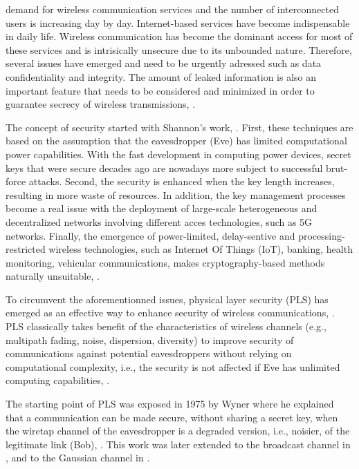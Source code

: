 \documentclass[journal,comsoc]{IEEEtran}
\begin{document}
 demand for wireless communication services and the number of interconnected users is increasing day by day. Internet-based services have become indispensable in daily life. Wireless communication has become the dominant access for most of these services and is intrisically unsecure due to its unbounded nature. Therefore, several issues have emerged and need to be urgently adressed such as data confidentiality and integrity. The amount of leaked information is also an important feature that needs to be considered and minimized in order to guarantee secrecy of wireless transmissions, \cite{8509094,8543573,BlochMatthieu1981-2011Ps:f}.

The concept of security started with Shannon's work, \cite{6769090}. First, these techniques are based on the assumption that the eavesdropper (Eve) has limited computational power capabilities. With the fast development in computing power devices, secret keys that were secure decades ago are nowadays more subject to successful brut-force attacks. Second, the security is enhanced when the key length increases, resulting in more waste of resources. In addition, the key management processes become a real issue with the deployment of large-scale heterogeneous and decentralized networks involving different acces technologies, such as 5G networks. Finally, the emergence of power-limited, delay-sentive and processing-restricted wireless technologies, such as Internet Of Things (IoT), banking, health monitoring, vehicular communications, makes cryptography-based methods naturally unsuitable, \cite{8509094}.

To circumvent the aforementionned issues, physical layer security (PLS) has emerged as an effective way to enhance security of wireless communications, \cite{alves2012performance,yang2012physical,tran2015secrecy,8353879}. PLS classically takes benefit of the characteristics of wireless channels (e.g., multipath fading, noise, dispersion, diversity) to improve security of communications against potential eavesdroppers without relying on computational complexity, i.e., the security is not affected if Eve has unlimited computing capabilities, \cite{9049811,snchez2020survey}. 

The starting point of PLS was exposed in 1975 by Wyner where he explained that a communication can be made secure, without sharing a secret key, when the wiretap channel of the eavesdropper is a degraded version, i.e., noisier, of the legitimate link (Bob), \cite{6772207}. This work was later extended to the broadcast channel in \cite{1055892}, and to the Gaussian channel in \cite{1055917}. 
\end{document}
